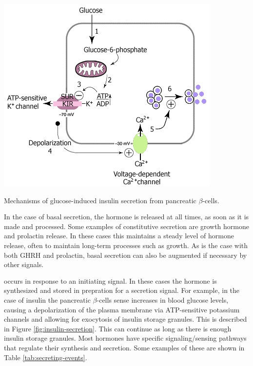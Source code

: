 \documentclass{tufte-handout}
\begin{document}
\begin{marginfigure}
  \includegraphics{figures/insulin-secretion}
  \caption{Mechanisms of glucose-induced insulin secretion from pancreatic $\beta$-cells.}
    \label{fig:insulin-secretion}
\end{marginfigure}

  In the case of basal secretion, the hormone is released at all times, as soon as it is made and processed.  Some examples of constitutive secretion are growth hormone and prolactin release.  In these cases this maintains a steady level of hormone release, often to maintain long-term processes such as growth.  As is the case with both GHRH and prolactin, basal secretion can also be augmented if necessary by other signals.

 occurs in response to an initiating signal.  In these cases the hormone is synthesized and stored in prepration for a secretion signal.  For example, in the case of insulin the pancreatic $\beta$-cells sense increases in blood glucose levels, causing a depolarization of the plasma membrane via ATP-sensitive potassium channels and allowing for exocytosis of insulin storage granules.  This is described in Figure \ref{fig:insulin-secretion}.  This can continue as long as there is enough insulin storage granules.  Most hormones have specific signaling/sensing pathways that regulate their synthesis and secretion.  Some examples of these are shown in Table \ref{tab:secreting-events}.
\end{document}
